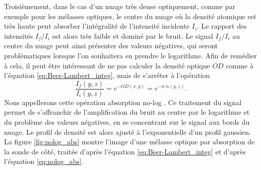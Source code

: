 \newpage
Troisièmement, %
dans le cas d'un nuage très dense optiquement, comme par exemple pour les mélasses optiques, le centre du nuage où la densité atomique est très haute peut absorber l'intégralité de l'intensité incidente $I_i$.
Le rapport des intensités $I_f/I_i$ est alors très faible et dominé par le bruit.
Le signal $I_f/I_i$ au centre du nuage peut ainsi présenter des valeurs négatives, qui seront problématiques lorsque l'on souhaitera en prendre le logarithme.
Afin de remédier à cela, il peut être intéressant de ne pas calculer la densité optique $OD$ comme à l'équation \eqref{eq:Beer-Lambert_integ}, mais de s'arrêter à l'opération 
\begin{equation}
\label{eq:nolog_abs}
\frac{I_f(y,z)}{I_i(y,z)} = e^{-OD(x,y)} = e^{-\sigma .n(y,z)}.
\end{equation}
Nous appellerons cette opération \og absorption no-log \fg{}.
Ce traitement du signal permet de s'affranchir de \og l'amplification \fg{} du bruit au centre par le logarithme et du problème des valeurs négatives, en se concentrant sur le signal aux bords du nuage.
Le profil de densité est alors ajusté à l'exponentielle d'un profil gaussien.
La figure \eqref{fig:nolog_abs} montre l'image d'une mélasse optique par absorption de la sonde de côté, traitée d'après l'équation \eqref{eq:Beer-Lambert_integ} et d'après l'équation \eqref{eq:nolog_abs}.
		

